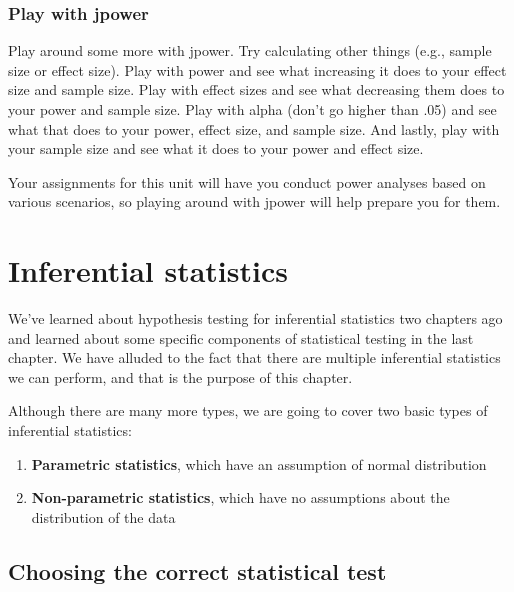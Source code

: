 \documentclass[
]{book}
\providecommand{\tightlist}{%
  \setlength{\itemsep}{0pt}\setlength{\parskip}{0pt}}
\begin{document}
\hypertarget{play-with-jpower}{%
\subsection{Play with jpower}\label{play-with-jpower}}

Play around some more with jpower. Try calculating other things (e.g., sample size or effect size). Play with power and see what increasing it does to your effect size and sample size. Play with effect sizes and see what decreasing them does to your power and sample size. Play with alpha (don't go higher than .05) and see what that does to your power, effect size, and sample size. And lastly, play with your sample size and see what it does to your power and effect size.

Your assignments for this unit will have you conduct power analyses based on various scenarios, so playing around with jpower will help prepare you for them.

\hypertarget{inferential-statistics}{%
\chapter{Inferential statistics}\label{inferential-statistics}}

We've learned about hypothesis testing for inferential statistics two chapters ago and learned about some specific components of statistical testing in the last chapter. We have alluded to the fact that there are multiple inferential statistics we can perform, and that is the purpose of this chapter.

Although there are many more types, we are going to cover two basic types of inferential statistics:

\begin{enumerate}
\def\labelenumi{\arabic{enumi}.}
\tightlist
\item
  \textbf{Parametric statistics}, which have an assumption of normal distribution
\item
  \textbf{Non-parametric statistics}, which have no assumptions about the distribution of the data
\end{enumerate}

\hypertarget{choosing-the-correct-statistical-test}{%
\section{Choosing the correct statistical test}\label{choosing-the-correct-statistical-test}}
\end{document}
